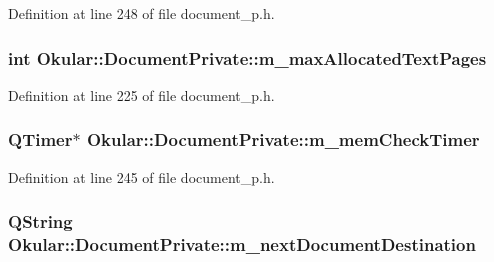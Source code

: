 Definition at line 248 of file document\+\_\+p.\+h.

\hypertarget{classOkular_1_1DocumentPrivate_ad1a0b7d1cb235cc915a46d242a04e1dc}{
\subsubsection[{m\+\_\+max\+Allocated\+Text\+Pages}]{\setlength{\rightskip}{0pt plus 5cm}int Okular\+::\+Document\+Private\+::m\+\_\+max\+Allocated\+Text\+Pages}}\label{classOkular_1_1DocumentPrivate_ad1a0b7d1cb235cc915a46d242a04e1dc}


Definition at line 225 of file document\+\_\+p.\+h.

\hypertarget{classOkular_1_1DocumentPrivate_aa403a95dfe9f344c12c7409319aaf62f}{
\subsubsection[{m\+\_\+mem\+Check\+Timer}]{\setlength{\rightskip}{0pt plus 5cm}Q\+Timer$\ast$ Okular\+::\+Document\+Private\+::m\+\_\+mem\+Check\+Timer}}\label{classOkular_1_1DocumentPrivate_aa403a95dfe9f344c12c7409319aaf62f}


Definition at line 245 of file document\+\_\+p.\+h.

\hypertarget{classOkular_1_1DocumentPrivate_a0c531a03865395da325584dbae6e1efe}{
\subsubsection[{m\+\_\+next\+Document\+Destination}]{\setlength{\rightskip}{0pt plus 5cm}Q\+String Okular\+::\+Document\+Private\+::m\+\_\+next\+Document\+Destination}}\label{classOkular_1_1DocumentPrivate_a0c531a03865395da325584dbae6e1efe}


